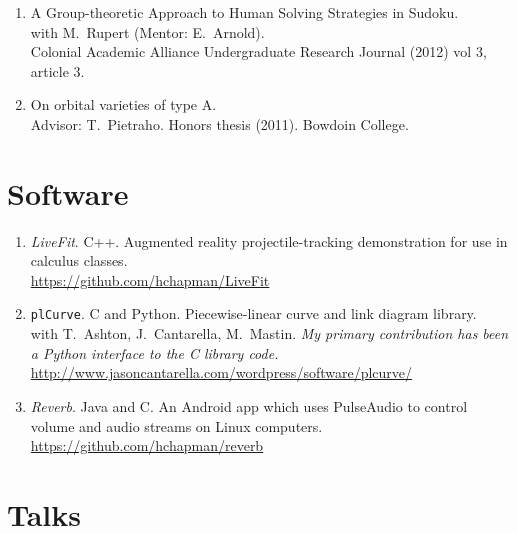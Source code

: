 \documentclass[letterpaper]{article}
\begin{document}
\begin{enumerate}
\item A Group-theoretic Approach to Human Solving Strategies in
  Sudoku.\\
  with M.\ Rupert (Mentor: E.\ Arnold). \\
  Colonial Academic Alliance Undergraduate Research Journal (2012) vol
  3, article 3.
\item On orbital varieties of type A. \\
  Advisor: T.\ Pietraho. Honors thesis (2011). Bowdoin
  College.
\end{enumerate}

\section*{Software}

\begin{enumerate}
\item \emph{LiveFit}. C++. Augmented reality projectile-tracking demonstration
  for use in calculus classes. \\
  \url{https://github.com/hchapman/LiveFit}
\item \texttt{plCurve}. C and Python. Piecewise-linear curve and link diagram library.\\
  with T.\ Ashton, J.\ Cantarella, M.\ Mastin.
  \textit{My primary contribution has been a Python interface to the C
    library code.} \\
  \url{http://www.jasoncantarella.com/wordpress/software/plcurve/}
\item \emph{Reverb}. Java and C. An Android app which uses PulseAudio to
  control volume and audio streams on Linux computers. \\
  \url{https://github.com/hchapman/reverb}
\end{enumerate}

\section*{Talks}
\end{document}
